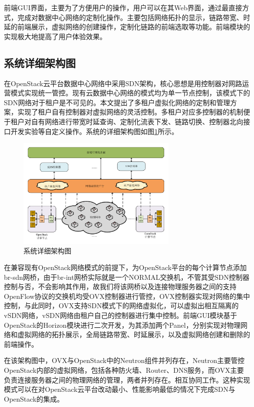 前端GUI界面，主要为了方便用户的操作，用户可以在其Web界面，通过最直接方式，完成对数据中心网络的定制化操作。主要包括网络拓扑的显示，链路带宽、时延的前端展示，虚拟网络的创建操作，定制化链路的前端选取等功能。前端模块的实现极大地提高了用户体验效果。

\subsection{系统详细架构图}
在OpenStack云平台数据中心网络中采用SDN架构，核心思想是用控制器对网路运营模式实现统一管控。现有云数据中心网络的模式均为单一节点控制，该模式下的SDN网络对于租户是不可见的。本文提出了多租户虚拟化网络的定制和管理方案，实现了租户自有控制器对虚拟网络的灵活控制。多租户对应多控制器的机制便于租户对自有网络进行带宽时延查询、定制化流表下发、链路切换、控制器北向接口开发实验等自定义操作。系统的详细架构图如图\ref{fig:architecture}所示。

\begin{figure}[!htb]
  \centering
  \includegraphics[width=0.7\textwidth]{logo/architecture}
  \caption{系统详细架构图}
  \label{fig:architecture}
\end{figure}

在兼容现有OpenStack网络模式的前提下，为OpenStack平台的每个计算节点添加br-sdn网桥，由于br-int网桥实际就是一个NORMAL交换机，不管其受SDN控制器控制与否，不会影响其作用，故我们将该网桥以及连接物理服务器之间的支持OpenFlow协议的交换机均受OVX控制器进行管控，OVX控制器实现对网络的集中控制，与此同时，OVX支持SDN模式下的网络虚拟化，可以虚拟出相互隔离的vSDN网络，vSDN网络由租户自己的控制器进行集中控制。前端GUI模块基于OpenStack的Horizon模块进行二次开发，为其添加两个Panel，分别实现对物理网络和虚拟网络的拓扑展示，全局链路带宽、时延展示，以及虚拟网络创建和删除的前端操作。

在该架构图中，OVX与OpenStack中的Neutron组件并列存在，Neutron主要管控OpenStack内部的虚拟网络，包括各种防火墙、Router、DNS服务，而OVX主要负责连接服务器之间的物理网络的管理，两者并列存在。相互协同工作。这种实现模式可以在对OpenStack云平台改动最小、性能影响最低的情况下完成SDN与OpenStack的集成。

